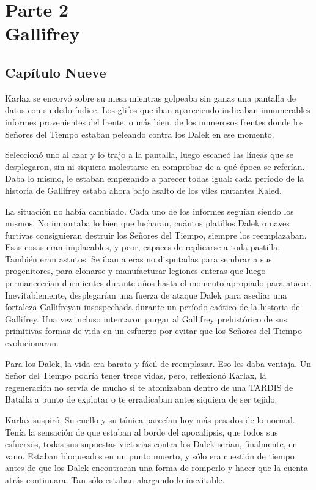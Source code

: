 \part*{Parte 2 \\ \vspace{2 mm} {\large Gallifrey}}
\chapter*{Capítulo Nueve}

Karlax se encorvó sobre su mesa mientras golpeaba sin ganas una pantalla de datos con su dedo índice. Los glifos que iban apareciendo indicaban innumerables informes provenientes del frente, o más bien, de los numerosos frentes donde los Señores del Tiempo estaban peleando contra los Dalek en ese momento.

Seleccionó uno al azar y lo trajo a la pantalla, luego escaneó las líneas que se desplegaron, sin ni siquiera molestarse en comprobar de a qué época se referían. Daba lo mismo, le estaban empezando a parecer todas igual: cada período de la historia de Gallifrey estaba ahora bajo asalto de los viles mutantes Kaled.

La situación no había cambiado. Cada uno de los informes seguían siendo los mismos. No importaba lo bien que lucharan, cuántos platillos Dalek o naves furtivas consiguieran destruir los Señores del Tiempo, siempre los reemplazaban. Esas cosas eran implacables, y peor, capaces de replicarse a toda pastilla. También eran astutos. Se iban a eras no disputadas para sembrar a sus progenitores, para clonarse y manufacturar legiones enteras que luego permanecerían durmientes durante años hasta el momento apropiado para atacar. Inevitablemente, desplegarían una fuerza de ataque Dalek para asediar una fortaleza Gallifreyan insospechada durante un período caótico de la historia de Gallifrey. Una vez incluso intentaron purgar al Gallifrey prehistórico de sus primitivas formas de vida en un esfuerzo por evitar que los Señores del Tiempo evolucionaran.

Para los Dalek, la vida era barata y fácil de reemplazar. Eso les daba ventaja. Un Señor del Tiempo podría tener trece vidas, pero, reflexionó Karlax, la regeneración no servía de mucho si te atomizaban dentro de una TARDIS de Batalla a punto de explotar o te erradicaban antes siquiera de ser tejido.

Karlax suspiró. Su cuello y su túnica parecían hoy más pesados de lo normal. Tenía la sensación de que estaban al borde del apocalipsis, que todos sus esfuerzos, todas sus supuestas victorias contra los Dalek serían, finalmente, en vano. Estaban bloqueados en un punto muerto, y sólo era cuestión de tiempo antes de que los Dalek encontraran una forma de romperlo y hacer que la cuenta atrás continuara. Tan sólo estaban alargando lo inevitable.

